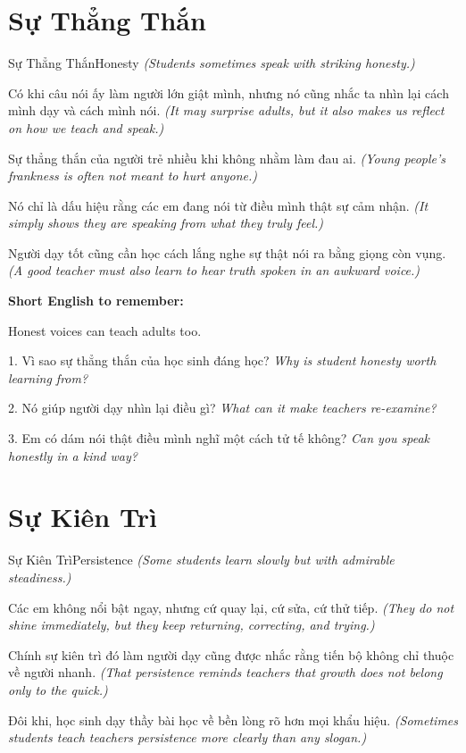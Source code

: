 \section{Sự Thẳng Thắn}
\begin{truyen}{Sự Thẳng Thắn}{Honesty}
\textit{(Students sometimes speak with striking honesty.)}

Có khi câu nói ấy làm người lớn giật mình, nhưng nó cũng nhắc ta nhìn lại cách mình dạy và cách mình nói.
\textit{(It may surprise adults, but it also makes us reflect on how we teach and speak.)}

Sự thẳng thắn của người trẻ nhiều khi không nhằm làm đau ai.
\textit{(Young people's frankness is often not meant to hurt anyone.)}

Nó chỉ là dấu hiệu rằng các em đang nói từ điều mình thật sự cảm nhận.
\textit{(It simply shows they are speaking from what they truly feel.)}
\end{truyen}

\begin{baihoc}
Người dạy tốt cũng cần học cách lắng nghe sự thật nói ra bằng giọng còn vụng.
\textit{(A good teacher must also learn to hear truth spoken in an awkward voice.)}
\end{baihoc}

\begin{ghinhoanh}
\textbf{Short English to remember:}

Honest voices can teach adults too.

\end{ghinhoanh}

\begin{tuhocnhanh}
1. Vì sao sự thẳng thắn của học sinh đáng học? \textit{Why is student honesty worth learning from?}

2. Nó giúp người dạy nhìn lại điều gì? \textit{What can it make teachers re-examine?}

3. Em có dám nói thật điều mình nghĩ một cách tử tế không? \textit{Can you speak honestly in a kind way?}
\end{tuhocnhanh}
\ngancach

\section{Sự Kiên Trì}
\begin{truyen}{Sự Kiên Trì}{Persistence}
\textit{(Some students learn slowly but with admirable steadiness.)}

Các em không nổi bật ngay, nhưng cứ quay lại, cứ sửa, cứ thử tiếp.
\textit{(They do not shine immediately, but they keep returning, correcting, and trying.)}

Chính sự kiên trì đó làm người dạy cũng được nhắc rằng tiến bộ không chỉ thuộc về người nhanh.
\textit{(That persistence reminds teachers that growth does not belong only to the quick.)}

Đôi khi, học sinh dạy thầy bài học về bền lòng rõ hơn mọi khẩu hiệu.
\textit{(Sometimes students teach teachers persistence more clearly than any slogan.)}
\end{truyen}


